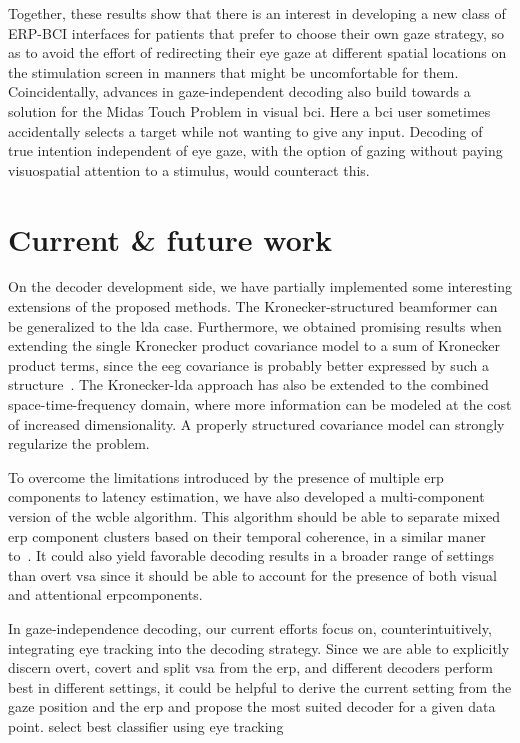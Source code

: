 Together, these results show that there is an interest in developing a new class of ERP-BCI
interfaces for patients that prefer to choose their own gaze strategy, so as to
avoid the effort of redirecting their eye gaze at different spatial locations
on the stimulation screen in manners that might be uncomfortable for them.
Coincidentally, advances in gaze-independent decoding also build towards a
solution for the Midas Touch Problem in visual \ac{bci}.
Here a \ac{bci} user sometimes accidentally selects a target while not wanting
to give any input.
Decoding of true intention independent of eye
gaze, with the option of gazing without paying visuospatial attention to a
stimulus, would counteract this.

\section{Current \& future work}
On the decoder development side, we have partially implemented some interesting
extensions of the proposed methods.
The Kronecker-structured beamformer can be generalized to the \ac{lda} case.
Furthermore, we obtained promising results when extending the single
Kronecker product covariance model to a sum of Kronecker product terms, since
the \ac{eeg} covariance is probably better expressed by such a
structure~\cite{Bijma2005}.
The Kronecker-lda approach has also be extended to the combined
space-time-frequency domain, where more information can be modeled at the cost
of increased dimensionality.
A properly structured covariance model can strongly regularize the problem.

To overcome the limitations introduced by the presence of multiple \ac{erp}
components to latency estimation, we have also developed a multi-component
version of the \ac{wcble} algorithm.
This algorithm should be able to separate mixed \ac{erp} component clusters
based on their temporal coherence, in a similar maner to~\textcite{Ouyang2017}.
It could also yield favorable decoding results in a broader range of settings
than overt \ac{vsa} since it should be able to account for the presence of both
visual and attentional \ac{erp}components.

In gaze-independence decoding, our current efforts focus on,
counterintuitively, integrating eye tracking into the decoding strategy.
Since we are able to explicitly discern overt, covert and split \ac{vsa} from
the \ac{erp}, and different decoders perform best in different settings, it
could be helpful to derive the current setting from the gaze position and the
\ac{erp} and propose the most suited decoder for a given data point.
select best classifier using eye tracking

